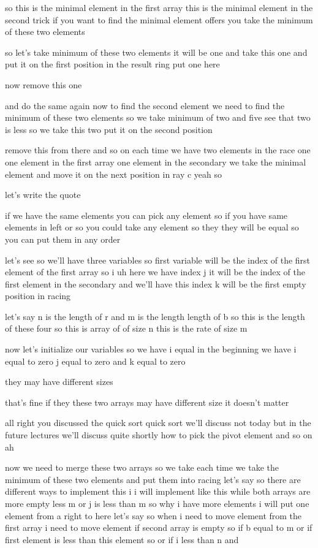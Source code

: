 so this is the minimal element in the first array this is the minimal element in the second trick if you want to find the minimal element offers you take the minimum of these two elements

so let's take minimum of these two elements it will be one and take this one and put it on the first position in the result ring put one here

now remove this one

and do the same again now to find the second element we need to find the minimum of these two elements so we take minimum of two and five see that two is less so we take this two put it on the second position

remove this from there and so on each time we have two elements in the race one one element in the first array one element in the secondary we take the minimal element and move it on the next position in ray c yeah so

let's write the quote

if we have the same elements you can pick any element so if you have same elements in left or so you could take any element so they they will be equal so you can put them in any order

let's see so we'll have three variables so first variable will be the index of the first element of the first array so i uh here we have index j it will be the index of the first element in the secondary and we'll have this index k will be the first empty position in racing

let's say n is the length of r and m is the length length of b so this is the length of these four so this is array of of size n this is the rate of size m

now let's initialize our variables so we have i equal in the beginning we have i equal to zero j equal to zero and k equal to zero

they may have different sizes

that's fine if they these two arrays may have different size it doesn't matter

all right you discussed the quick sort quick sort we'll discuss not today but in the future lectures we'll discuss quite shortly how to pick the pivot element and so on ah

now we need to merge these two arrays so we take each time we take the minimum of these two elements and put them into racing let's say so there are different ways to implement this i i will implement like this while both arrays are more empty less m or j is less than m so why i have more elements i will put one element from a right to here let's say so when i need to move element from the first array i need to move element if second array is empty so if b equal to m or if first element is less than this element so or if i less than n and

